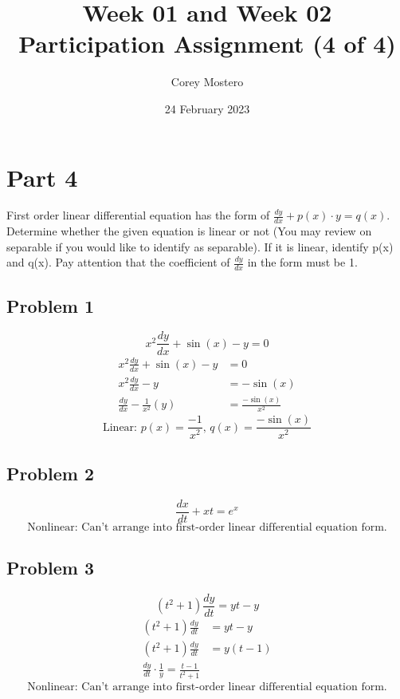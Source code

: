 \documentclass{article}
\title{Week 01 and Week 02 Participation Assignment (4 of 4)}
\date{24 February 2023}
\author{Corey Mostero}
\begin{document}
\newcommand{\hr}{\par\noindent\rule{\textwidth}{0.4pt}}

\maketitle
\newpage

\tableofcontents

\section{Part 4}
First order linear differential equation has the form of $ \frac{dy}{dx} + p(x) \cdot y = q(x) $. Determine whether the given equation is linear or not (You may review on separable if you would like to identify as separable). If it is linear, identify p(x) and q(x). Pay attention that the coefficient of $ \frac{dy}{dx} $ in the form must be 1.

\subsection{Problem 1}
$$ x^2\frac{dy}{dx} + \sin(x) - y = 0 $$
\begin{align*}
    x^2\frac{dy}{dx} + \sin(x) - y & = 0 \\
    x^2\frac{dy}{dx} - y & = -\sin(x) \\
    \frac{dy}{dx} - \frac{1}{x^2}(y) & = \frac{-\sin(x)}{x^2}
\end{align*}
\begin{equation*}
    \boxed{
        \text{Linear: } p(x) = \frac{-1}{x^2} \text{, } q(x) = \frac{-\sin(x)}{x^2}
    }
\end{equation*}

\subsection{Problem 2}
$$ \frac{dx}{dt} + xt = e^x $$
\begin{equation*}
    \boxed{
        \text{Nonlinear: Can't arrange into first-order linear differential equation form.}
    }
\end{equation*}

\subsection{Problem 3}
$$ \left(t^2 + 1\right)\frac{dy}{dt} = yt - y $$
\begin{align*}
    \left(t^2 + 1\right)\frac{dy}{dt} & = yt - y \\
    \left(t^2 + 1\right)\frac{dy}{dt} & = y\left(t - 1\right) \\
    \frac{dy}{dt} \cdot \frac{1}{y} = \frac{t - 1}{t^2 + 1}
\end{align*}
\begin{equation*}
    \boxed{
        \text{Nonlinear: Can't arrange into first-order linear differential equation form.}
    }
\end{equation*}
\end{document}
